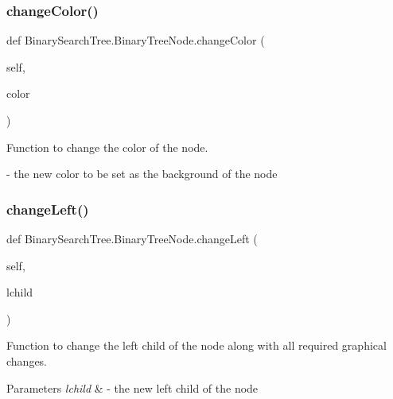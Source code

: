 \subsubsection{\texorpdfstring{change\+Color()}{changeColor()}}
{\footnotesize\ttfamily def Binary\+Search\+Tree.\+Binary\+Tree\+Node.\+change\+Color (\begin{DoxyParamCaption}\item[{}]{self,  }\item[{}]{color }\end{DoxyParamCaption})}



Function to change the color of the node. 

-\/ the new color to be set as the background of the node \mbox{\label{class_binary_search_tree_1_1_binary_tree_node_af69ab5e5100d035c4808ce89e2e6e835}} 
\subsubsection{\texorpdfstring{change\+Left()}{changeLeft()}}
{\footnotesize\ttfamily def Binary\+Search\+Tree.\+Binary\+Tree\+Node.\+change\+Left (\begin{DoxyParamCaption}\item[{}]{self,  }\item[{}]{lchild }\end{DoxyParamCaption})}



Function to change the left child of the node along with all required graphical changes. 


\begin{DoxyParams}{Parameters}
{\em lchild} & -\/ the new left child of the node \\
\hline
\end{DoxyParams}
\mbox{\label{class_binary_search_tree_1_1_binary_tree_node_a630b102ad6c1ccbdca6fd3b8f19260db}} 
